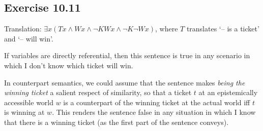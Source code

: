 \documentclass{scrartcl}
\begin{document}
  \subsection*{Exercise 10.11}

%
%
  Translation: $\exists x (Tx \land Wx \land \neg K Wx \land \neg K \neg Wx)$,
  where $T$ translates `-- is a ticket' and `-- will win'.

  If variables are directly referential, then this sentence is true in any
  scenario in which I don't know which ticket will win.

  In counterpart semantics, we could assume that the sentence makes \emph{being
    the winning ticket} a salient respect of similarity, so that a ticket $t$ at
  an epistemically accessible world $w$ is a counterpart of the winning ticket
  at the actual world iff $t$ is winning at $w$. This renders the sentence false
  in any situation in which I know that there is a winning ticket (as the
  first part of the sentence conveys).
\end{document}
